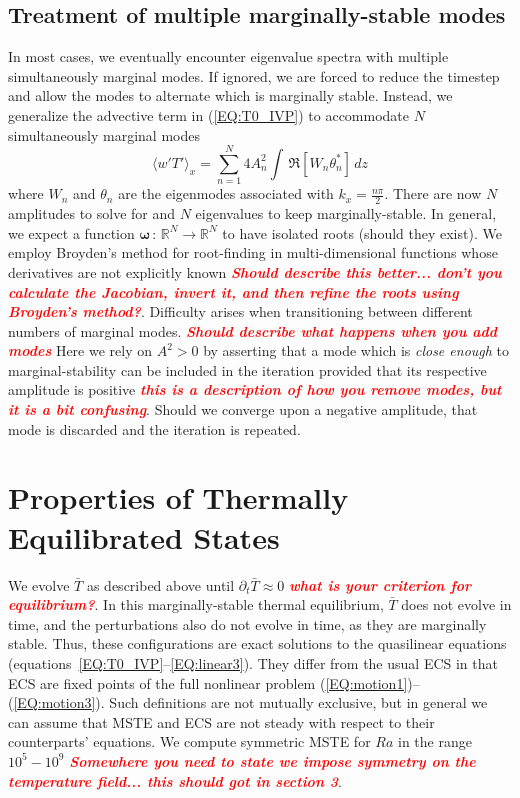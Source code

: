 \documentclass[reprint,amsmath,amssymb,aps]{revtex4-1}
\newcommand{\note}[1]{\noindent \textbf{\textit{\textcolor{Red}{#1}}}}
\newcommand{\eq}[1]{(\ref{#1})}
\begin{document}
\subsection{Treatment of multiple marginally-stable modes} \label{sec:multiple_modes}
In most cases, we eventually encounter eigenvalue spectra with multiple simultaneously marginal modes.
If ignored, we are forced to reduce the timestep and allow the modes to alternate which is marginally stable.
Instead, we generalize the advective term in \eq{EQ:T0_IVP} to accommodate $N$ simultaneously marginal modes
\begin{equation}
    \langle w' T' \rangle_x = \sum_{n = 1}^{N} 4 A_n^2 \int \, \Re\left[ W_n \theta_n^* \right] \,dz
\end{equation}
where $W_n$ and $\theta_n$ are the eigenmodes associated with $k_x = \frac{n\pi}{2}$. 
There are now $N$ amplitudes to solve for and $N$ eigenvalues to keep marginally-stable. 
In general, we expect a function $\mathbf{\omega} \, : \, \mathbb{R}^N \to  \mathbb{R}^N$ to have isolated roots (should they exist). 
We employ Broyden's method for root-finding in multi-dimensional functions whose derivatives are not explicitly known \note{Should describe this better... don't you calculate the Jacobian, invert it, and then refine the roots using Broyden's method?}.
Difficulty arises when transitioning between different numbers of marginal modes.
\note{Should describe what happens when you add modes}
Here we rely on $A^2 > 0$ by asserting that a mode which is \textit{close enough} to marginal-stability can be included in the iteration provided that its respective amplitude is positive \note{this is a description of how you remove modes, but it is a bit confusing}. 
Should we converge upon a negative amplitude, that mode is discarded and the iteration is repeated. 

\section{Properties of Thermally Equilibrated States}\label{sec:properties}
We evolve $\bar{T}$ as described above until $\partial_t\bar{T}\approx 0$ \note{what is your criterion for equilibrium?}.
In this marginally-stable thermal equilibrium, $\bar{T}$ does not evolve in time, and the perturbations also do not evolve in time, as they are marginally stable.
Thus, these configurations are exact solutions to the quasilinear equations (equations~\ref{EQ:T0_IVP}--\ref{EQ:linear3}).
They differ from the usual ECS in that ECS are fixed points of the full nonlinear problem (\ref{EQ:motion1})--(\ref{EQ:motion3}). 
Such definitions are not mutually exclusive, but in general we can assume that MSTE and ECS are not steady with respect to their counterparts' equations.
We compute symmetric MSTE for $Ra$ in the range $10^5 - 10^9$ \note{Somewhere you need to state we impose symmetry on the temperature field... this should got in section 3}. 
\end{document}
